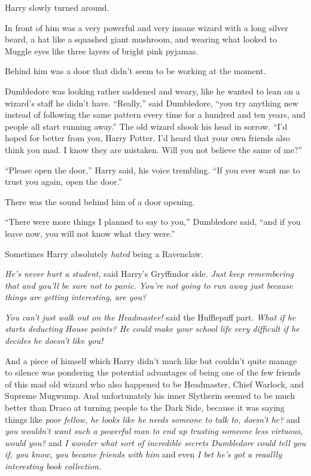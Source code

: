 Harry slowly turned around.

In front of him was a very powerful and very insane wizard with a long
silver beard, a hat like a squashed giant mushroom, and wearing what
looked to Muggle eyes like three layers of bright pink pyjamas.

Behind him was a door that didn't seem to be working at the moment.

Dumbledore was looking rather saddened and weary, like he wanted to lean
on a wizard's staff he didn't have. ``Really,'' said Dumbledore, ``you
try anything new instead of following the same pattern every time for a
hundred and ten years, and people all start running away.'' The old
wizard shook his head in sorrow. ``I'd hoped for better from you, Harry
Potter. I'd heard that your own friends also think you mad. I know they
are mistaken. Will you not believe the same of me?''

``Please open the door,'' Harry said, his voice trembling. ``If you ever
want me to trust you again, open the door.''

There was the sound behind him of a door opening.

``There were more things I planned to say to you,'' Dumbledore said,
``and if you leave now, you will not know what they were.''

Sometimes Harry absolutely \emph{hated} being a Ravenclaw.

\emph{He's never hurt a student,} said Harry's Gryffindor side.
\emph{Just keep remembering that and you'll be sure not to panic. You're
not going to run away just because things are getting interesting, are
you?}

\emph{You can't just walk out on the Headmaster!} said the Hufflepuff
part. \emph{What if he starts deducting House points? He could make your
school life very difficult if he decides he doesn't like you!}

And a piece of himself which Harry didn't much like but couldn't quite
manage to silence was pondering the potential advantages of being one of
the few friends of this mad old wizard who also happened to be
Headmaster, Chief Warlock, and Supreme Mugwump. And unfortunately his
inner Slytherin seemed to be much better than Draco at turning people to
the Dark Side, because it was saying things like \emph{poor fellow, he
looks like he needs someone to talk to, doesn't he?} and \emph{you
wouldn't want such a powerful man to end up trusting someone less
virtuous, would you?} and \emph{I wonder what sort of incredible secrets
Dumbledore could tell you if, you know, you became friends with him} and
even \emph{I bet he's got a reaallly interesting book collection.}


